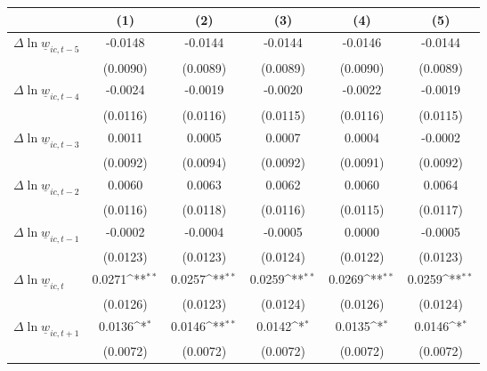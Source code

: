{
\def\sym#1{\ifmmode^{#1}\else\(^{#1}\)\fi}
\begin{tabular}{l*{5}{c}}
\hline\hline
          &\multicolumn{1}{c}{(1)}         &\multicolumn{1}{c}{(2)}         &\multicolumn{1}{c}{(3)}         &\multicolumn{1}{c}{(4)}         &\multicolumn{1}{c}{(5)}         \\
\hline
$\Delta \ln \underline{w}_{ic,t-5}$&  -0.0148         &  -0.0144         &  -0.0144         &  -0.0146         &  -0.0144         \\
          & (0.0090)         & (0.0089)         & (0.0089)         & (0.0090)         & (0.0089)         \\
[1em]
$\Delta \ln \underline{w}_{ic,t-4}$&  -0.0024         &  -0.0019         &  -0.0020         &  -0.0022         &  -0.0019         \\
          & (0.0116)         & (0.0116)         & (0.0115)         & (0.0116)         & (0.0115)         \\
[1em]
$\Delta \ln \underline{w}_{ic,t-3}$&   0.0011         &   0.0005         &   0.0007         &   0.0004         &  -0.0002         \\
          & (0.0092)         & (0.0094)         & (0.0092)         & (0.0091)         & (0.0092)         \\
[1em]
$\Delta \ln \underline{w}_{ic,t-2}$&   0.0060         &   0.0063         &   0.0062         &   0.0060         &   0.0064         \\
          & (0.0116)         & (0.0118)         & (0.0116)         & (0.0115)         & (0.0117)         \\
[1em]
$\Delta \ln \underline{w}_{ic,t-1}$&  -0.0002         &  -0.0004         &  -0.0005         &   0.0000         &  -0.0005         \\
          & (0.0123)         & (0.0123)         & (0.0124)         & (0.0122)         & (0.0123)         \\
[1em]
$\Delta \ln \underline{w}_{ic,t}$&   0.0271\sym{**} &   0.0257\sym{**} &   0.0259\sym{**} &   0.0269\sym{**} &   0.0259\sym{**} \\
          & (0.0126)         & (0.0123)         & (0.0124)         & (0.0126)         & (0.0124)         \\
[1em]
$\Delta \ln \underline{w}_{ic,t+1}$&   0.0136\sym{*}  &   0.0146\sym{**} &   0.0142\sym{*}  &   0.0135\sym{*}  &   0.0146\sym{*}  \\
          & (0.0072)         & (0.0072)         & (0.0072)         & (0.0072)         & (0.0072)         \\

\end{tabular}}
